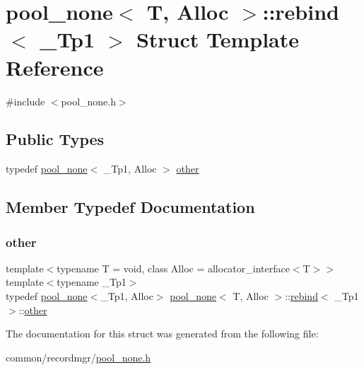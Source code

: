 \hypertarget{structpool__none_1_1rebind}{}\section{pool\+\_\+none$<$ T, Alloc $>$\+:\+:rebind$<$ \+\_\+\+Tp1 $>$ Struct Template Reference}
\label{structpool__none_1_1rebind}


{\ttfamily \#include $<$pool\+\_\+none.\+h$>$}

\subsection*{Public Types}
\begin{DoxyCompactItemize}
\item 
typedef \hyperlink{classpool__none}{pool\+\_\+none}$<$ \+\_\+\+Tp1, Alloc $>$ \hyperlink{structpool__none_1_1rebind_a2855fbd611cf9a20ca97f75cd0f81560}{other}
\end{DoxyCompactItemize}


\subsection{Member Typedef Documentation}
\mbox{\label{structpool__none_1_1rebind_a2855fbd611cf9a20ca97f75cd0f81560}} 
\subsubsection{\texorpdfstring{other}{other}}
{\footnotesize\ttfamily template$<$typename T  = void, class Alloc  = allocator\+\_\+interface$<$\+T$>$$>$ \\
template$<$typename \+\_\+\+Tp1$>$ \\
typedef \hyperlink{classpool__none}{pool\+\_\+none}$<$\+\_\+\+Tp1, Alloc$>$ \hyperlink{classpool__none}{pool\+\_\+none}$<$ T, Alloc $>$\+::\hyperlink{structpool__none_1_1rebind}{rebind}$<$ \+\_\+\+Tp1 $>$\+::\hyperlink{structpool__none_1_1rebind_a2855fbd611cf9a20ca97f75cd0f81560}{other}}



The documentation for this struct was generated from the following file\+:\begin{DoxyCompactItemize}
\item 
common/recordmgr/\hyperlink{pool__none_8h}{pool\+\_\+none.\+h}\end{DoxyCompactItemize}
